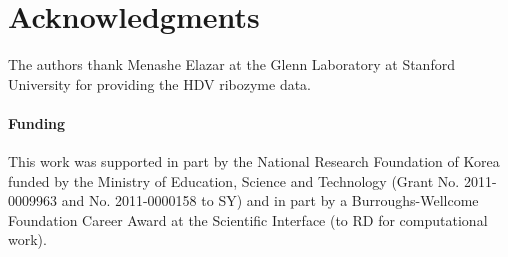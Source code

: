 \documentclass[letter]{bioinfo}
\begin{document}
\section*{Acknowledgments}
The authors thank Menashe Elazar at the Glenn Laboratory at Stanford University for providing the HDV ribozyme data.

\paragraph{Funding\textcolon}
This work was supported in part by the National Research Foundation of Korea funded by the Ministry of Education, Science and Technology (Grant No. 2011-0009963 and No. 2011-0000158 to SY) and in part by a Burroughs-Wellcome Foundation Career Award at the Scientific Interface (to RD for computational work).


%
%

\end{document}
